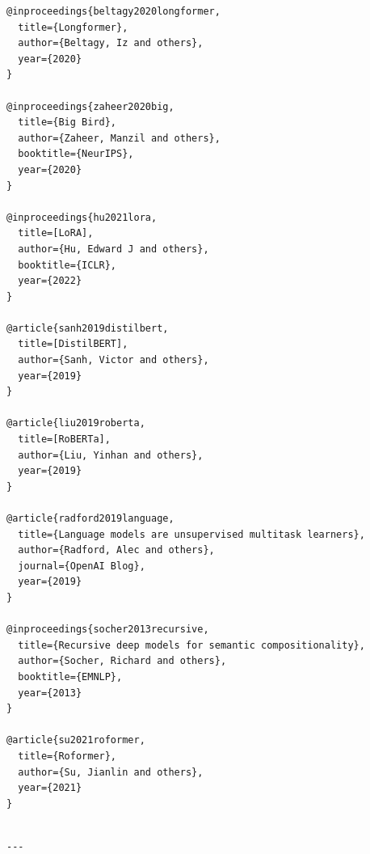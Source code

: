 \begin{lstlisting}
@inproceedings{beltagy2020longformer,
  title={Longformer},
  author={Beltagy, Iz and others},
  year={2020}
}

@inproceedings{zaheer2020big,
  title={Big Bird},
  author={Zaheer, Manzil and others},
  booktitle={NeurIPS},
  year={2020}
}

@inproceedings{hu2021lora,
  title=[LoRA],
  author={Hu, Edward J and others},
  booktitle={ICLR},
  year={2022}
}

@article{sanh2019distilbert,
  title=[DistilBERT],
  author={Sanh, Victor and others},
  year={2019}
}

@article{liu2019roberta,
  title=[RoBERTa],
  author={Liu, Yinhan and others},
  year={2019}
}

@article{radford2019language,
  title={Language models are unsupervised multitask learners},
  author={Radford, Alec and others},
  journal={OpenAI Blog},
  year={2019}
}

@inproceedings{socher2013recursive,
  title={Recursive deep models for semantic compositionality},
  author={Socher, Richard and others},
  booktitle={EMNLP},
  year={2013}
}

@article{su2021roformer,
  title={Roformer},
  author={Su, Jianlin and others},
  year={2021}
}
\end{lstlisting}
\begin{lstlisting}

---
\end{lstlisting}